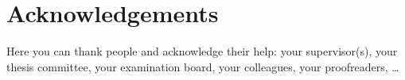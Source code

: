 \chapter*{Acknowledgements}
\label{sec:preface}

Here you can thank people and acknowledge their help: your supervisor(s), your thesis committee, your examination board, your colleagues, your proofreaders, \dots
